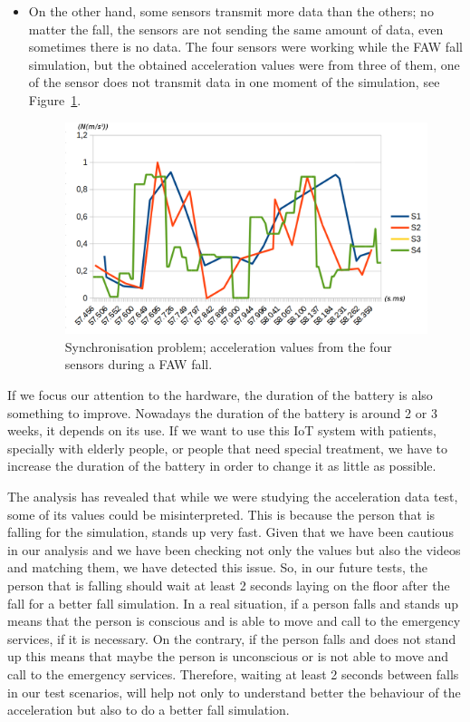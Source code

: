 \documentclass[conference]{IEEEtran}
\theoremstyle{definition}
\begin{document}
\begin{itemize}
 \item On the other hand, some sensors transmit more data than the others; no matter the fall, the sensors are not 
 sending the same amount of data, even sometimes there is no data. The four sensors were working while the FAW fall
 simulation, but the obtained acceleration values were from three of them, one of the sensor does not transmit data 
 in one moment of the simulation, see Figure~\ref{fig:synchronisation2}.
 
 \begin{figure}[!h]
  \centering
  \includegraphics[scale=0.2]{img/synchronisation2.png}
  \caption[Comparison acceleration during two FAW falls]{Synchronisation problem; acceleration values from the four sensors during a FAW fall.}
  \label{fig:synchronisation2}
 \end{figure}
\end{itemize}

If we focus our attention to the hardware, the duration of the battery is also something to improve. Nowadays the 
duration of the battery is around 2 or 3 weeks, it depends on its use. If we want to use this IoT system with patients, 
specially with elderly people, or people that need special treatment, we have to increase the duration of the battery 
in order to change it as little as possible.

The analysis has revealed that while we were studying the acceleration data test, some of its values could be misinterpreted.
This is because the person that is falling for the simulation, stands up very fast. Given that we have been cautious
in our analysis and we have been checking not only the values but also the videos and matching them, we have detected
this issue. So, in our future tests, the person that is falling should wait at least 2 seconds laying on the floor 
after the fall for a better fall simulation. In a real situation, if a person falls and stands up means that the person
is conscious and is able to move and call to the emergency services, if it is necessary. On the contrary, if the person
falls and does not stand up this means that maybe the person is unconscious or is not able to move and call to the emergency
services. Therefore, waiting at least 2 seconds between falls in our test scenarios, will help not only to understand 
better the behaviour of the acceleration but also to do a better fall simulation.
\end{document}
